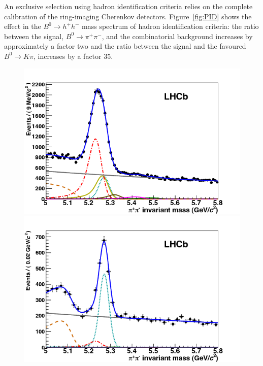 An exclusive selection using hadron identification criteria relies on the
complete calibration of the ring-imaging Cherenkov
detectors. Figure~\ref{fig:PID} shows the effect in the $B^0\to h^+ h^-$ mass
spectrum of hadron identification criteria: the ratio between the signal,
$B^0\to\pi^+\pi^-$, and the combinatorial background increases by approximately
a factor two and the ratio between the signal and the favoured $B^0\to K \pi$,
increases by a factor 35.
\begin{figure}[h]
\begin{minipage}{0.5\columnwidth}
\includegraphics[width=\columnwidth]{../figures/PID1}
\end{minipage}\hspace{2pc}%
\begin{minipage}{0.5\columnwidth}
\includegraphics[width=\columnwidth]{../figures/PID2}
\end{minipage} 

\end{figure}
